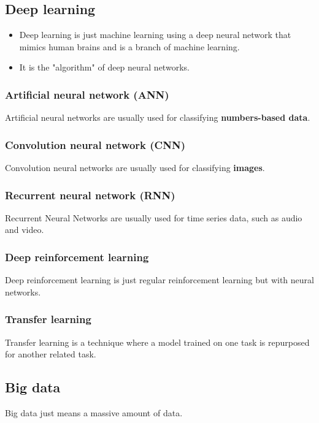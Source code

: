 \documentclass[11pt]{article}
\begin{document}
\subsection{Deep learning}
\label{sec:org3828981}
\begin{itemize}
\item Deep learning is just machine learning using a deep neural network that mimics human brains and is a branch of machine learning.
\item It is the "algorithm" of deep neural networks.
\end{itemize}

\subsubsection{Artificial neural network (ANN)}
\label{sec:orgaf6a59e}
Artificial neural networks are usually used for classifying \textbf{numbers-based data}.

\subsubsection{Convolution neural network (CNN)}
\label{sec:org8c9f735}
Convolution neural networks are usually used for classifying \textbf{images}.

\subsubsection{Recurrent neural network (RNN)}
\label{sec:org9e0db92}
Recurrent Neural Networks are usually used for time series data, such as audio and video.

\subsubsection{Deep reinforcement learning}
\label{sec:orgd04a088}
Deep reinforcement learning is just regular reinforcement learning but with neural networks.

\subsubsection{Transfer learning}
\label{sec:orgd0af509}
Transfer learning is a technique where a model trained on one task is repurposed for another related task.

\subsection{Big data}
\label{sec:orgfdfefc3}
Big data just means a massive amount of data.
\end{document}
